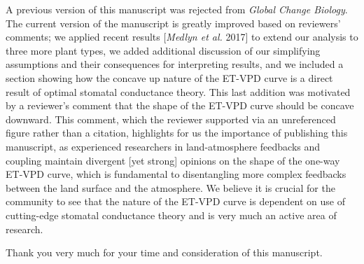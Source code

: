 \documentclass[10pt,stdletter,dateno]{newlfm}
\begin{document}
\begin{newlfm}
  A previous version of this manuscript was rejected from \textit{Global Change Biology}. The current version of the manuscript is greatly improved based on reviewers' comments; we applied recent results [\textit{Medlyn et al.} 2017] to extend our analysis to three more plant types, we added additional discussion of our simplifying assumptions and their consequences for interpreting results, and we included a section showing how the concave up nature of the ET-VPD curve is a direct result of optimal stomatal conductance theory. This last addition was motivated by a reviewer's comment that the shape of the ET-VPD curve should be concave downward. This comment, which the reviewer supported via an unreferenced figure rather than a citation, highlights for us the importance of publishing this manuscript, as experienced researchers in land-atmosphere feedbacks and coupling maintain divergent [yet strong] opinions on the shape of the one-way ET-VPD curve, which is fundamental to disentangling more complex feedbacks between the land surface and the atmosphere. We believe it is crucial for the community to see that the nature of the ET-VPD curve is dependent on use of cutting-edge stomatal conductance theory and is very much an active area of research.

    Thank you very much for your time and consideration of this manuscript.
  

\end{newlfm}
\end{document}
